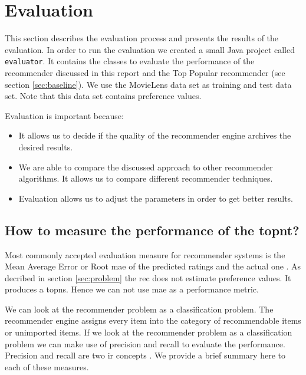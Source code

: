 \section{Evaluation}
\label{sec:evaluation}

This section describes the evaluation process and presents the results of the evaluation. In order to run the evaluation we created a small Java project called \verb|evaluator|. It contains the classes to evaluate the performance of the recommender discussed in this report and the Top Popular recommender (see section \ref{sec:baseline}). We use the MovieLens data set as training and test data set. Note that this data set contains preference values.

Evaluation is important because:
\begin{itemize}
  \item It allows us to decide if the quality of the recommender engine archives the desired results. 
  \item We are able to compare the discussed approach to other recommender algorithms. It allows us to compare different recommender techniques.
  \item Evaluation allows us to adjust the parameters in order to get better results.
\end{itemize}

\subsection{How to measure the performance of the \gls{topnt}?}

Most commonly accepted evaluation measure for recommender systems is the Mean Average Error or Root \gls{mae} of the predicted ratings and the actual one \cite{Ricci}\cite{jannach11}.
As decribed in section \ref{sec:problem} the \gls{rec} does not estimate preference values. It produces a \glspl{topn}. Hence we can not use \gls{mae} as a performance metric. 

We can look at the recommender problem as a classification problem. The recommender engine assigns every item into the category of recommendable items or unimported items.
If we look at the recommender problem as a classification problem we can make use of precision and recall to evaluate the performance. Precision and \gls{recall} are two \gls{ir} concepts \cite{Manning}. We provide a brief summary here to each of these measures.


